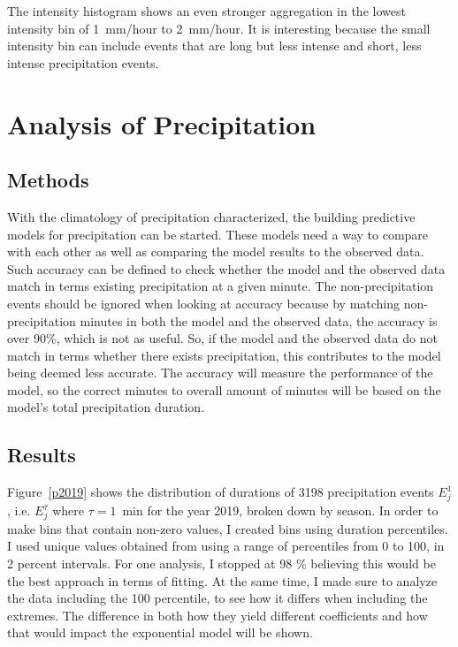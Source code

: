 \documentclass[11pt]{report}
\begin{document}
The intensity histogram shows an even stronger aggregation in the lowest
intensity bin of 1~mm/hour to 2~mm/hour. It is interesting because the small
intensity bin can include events that are long but less intense and short,
less intense precipitation events.

\section{Analysis of Precipitation}\label{sec:apc}


\subsection{Methods}\label{sec:methods}

With the climatology of precipitation characterized, the building predictive models for precipitation can be started. These models need a way to compare with each other as well as comparing the model results to the observed data. Such accuracy can be defined to check whether the model and the observed data match in terms existing precipitation at a given minute. The non-precipitation events should be ignored when looking at accuracy because by matching non-precipitation minutes in both the model and the observed data, the accuracy is over 90\%, which is not as useful. So, if the model and the
observed data do not match in terms whether there exists precipitation, this
contributes to the model being deemed less accurate. The accuracy will measure the performance of the model, so the correct minutes to overall amount of minutes will be based on the model's total precipitation duration. 


\subsection{Results}\label{sec:apcr}

Figure~\ref{p2019} shows the distribution of durations of 3198 precipitation
events $E_j^1$, i.e. $E_j^\tau$ where $\tau=1$~min for the year 2019, broken
down by season. In order to make bins that contain non-zero values, I
created bins using duration percentiles. I used unique values obtained from
using a range of percentiles from 0 to 100, in 2 percent
intervals. For one analysis, I stopped at 98 \% believing this would be the
best approach in terms of fitting. At the same time, I made sure to
analyze the data including the 100 percentile, to see how it differs when
including the extremes. The difference in both how they yield different
coefficients and how that would impact the exponential model will be shown. 
\end{document}
